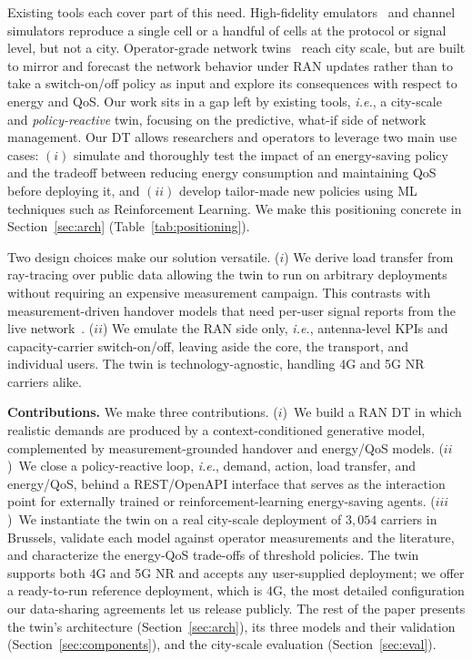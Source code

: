 \documentclass[sigconf, 10pt, anonymous, review]{acmart}
\newcommand{\ie}{\textit{i.e.},\xspace}
\begin{document}
Existing tools each cover part of this need.
High-fidelity emulators~\cite{ns3, colosseum} and channel simulators reproduce a single cell or a handful of cells at the protocol or signal level, but not a city. 
Operator-grade network twins~\cite{nokia_ran_dt, nvidia_aodt} reach city scale, but are built to mirror and forecast the network behavior under RAN updates rather than to take a switch-on/off policy as input and explore its consequences with respect to energy and \ac{QoS}. 
Our work sits in a gap left by existing tools, \ie a city-scale and \textit{policy-reactive} twin, focusing on the predictive, what-if side of network management. 
Our \ac{DT} allows researchers and operators to leverage two main use cases: $(i)$ simulate and thoroughly test the impact of an energy-saving policy and the tradeoff between reducing energy consumption and maintaining \ac{QoS} before deploying it, and $(ii)$ develop tailor-made new policies using \ac{ML} techniques such as Reinforcement Learning. 
We make this positioning concrete in Section~\ref{sec:arch} (Table~\ref{tab:positioning}).

Two design choices make our solution versatile. 
($i$) We derive load transfer from ray-tracing over public data allowing the twin to run on arbitrary deployments without requiring an expensive measurement campaign. This contrasts with measurement-driven handover models that need per-user signal reports from the live network~\cite{user_transfer_5g}.
($ii$) We emulate the \ac{RAN} side only, \ie antenna-level \acp{KPI} and capacity-carrier switch-on/off, leaving aside the core, the transport, and individual users. 
The twin is technology-agnostic, handling 4G and 5G NR carriers alike.

\noindent\textbf{Contributions.} We make three contributions.
($i$)~We build a \ac{RAN} \ac{DT} in which realistic demands are produced by a context-conditioned generative model, complemented by measurement-grounded handover and energy/\ac{QoS} models. 
($ii$)~We close a policy-reactive loop, \ie demand, action, load transfer, and energy/\ac{QoS}, behind a REST/OpenAPI interface that serves as the interaction point for externally trained or reinforcement-learning energy-saving agents.
($iii$)~We instantiate the twin on a real city-scale deployment of $3{,}054$ carriers in Brussels, validate each model against operator measurements and the literature, and characterize the energy-\ac{QoS} trade-offs of threshold policies. 
The twin supports both 4G and 5G NR and accepts any user-supplied deployment; we offer a ready-to-run reference deployment, which is 4G, the most detailed configuration our data-sharing agreements let us release publicly.
The rest of the paper presents the twin's architecture (Section~\ref{sec:arch}), its three models and their validation (Section~\ref{sec:components}), and the city-scale evaluation (Section~\ref{sec:eval}).
\end{document}

